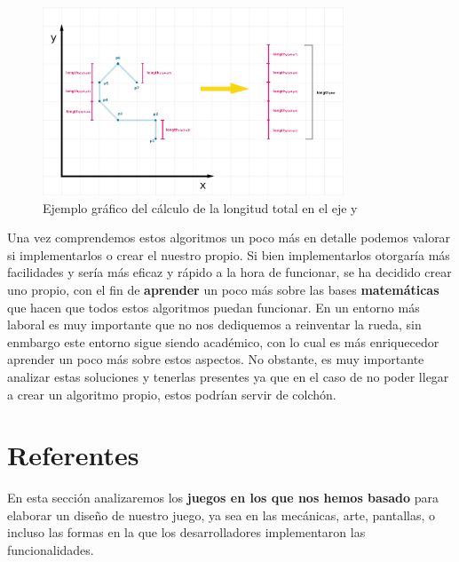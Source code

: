 \clearpage

\begin{figure}[htbp]
\centering
  \includegraphics[width=0.8\textwidth]{archivos/vertline_y.png}
  \caption{Ejemplo gráfico del cálculo de la longitud total en el eje y}
  \label{fig:vertline_y}
\end{figure}

\vspace{0.5cm}

Una vez comprendemos estos algoritmos un poco más en detalle podemos valorar si implementarlos o crear el nuestro propio. Si bien implementarlos otorgaría más facilidades y sería más eficaz y rápido a la hora de funcionar, se ha decidido crear uno propio, con el fin de \textbf{aprender} un poco más sobre las bases \textbf{matemáticas} que hacen que todos estos algoritmos puedan funcionar. En un entorno más laboral es muy importante que no nos dediquemos a reinventar la rueda, sin enmbargo este entorno sigue siendo académico, con lo cual es más enriquecedor aprender un poco más sobre estos aspectos. No obstante, es muy importante analizar estas soluciones y tenerlas presentes ya que en el caso de no poder llegar a crear un algoritmo propio, estos podrían servir de colchón.

\vspace{0.1cm}


\section{Referentes}

En esta sección analizaremos los \textbf{juegos en los que nos hemos basado} para elaborar un diseño de nuestro juego, ya sea en las mecánicas, arte, pantallas, o incluso las formas en la que los desarrolladores implementaron las funcionalidades.

\vspace{0.5cm}

